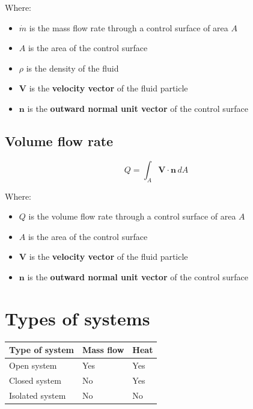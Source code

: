 \documentclass[11pt]{article}
\begin{document}
Where:
\begin{itemize}
\item \(\dot{m}\) is the mass flow rate through a control surface of area \(A\)
\item \(A\) is the area of the control surface
\item \(\rho\) is the density of the fluid
\item \(\boldsymbol{V}\) is the \textbf{velocity vector} of the fluid particle
\item \(\boldsymbol{n}\) is the \textbf{outward normal unit vector} of the control surface
\end{itemize}

\subsection{Volume flow rate}
\label{sec:orgc2857c3}
\[Q = \int_A \boldsymbol{V} \cdot \boldsymbol{n} \, dA\]

Where:
\begin{itemize}
\item \(Q\) is the volume flow rate through a control surface of area \(A\)
\item \(A\) is the area of the control surface
\item \(\boldsymbol{V}\) is the \textbf{velocity vector} of the fluid particle
\item \(\boldsymbol{n}\) is the \textbf{outward normal unit vector} of the control surface
\end{itemize}

\newpage

\section{Types of systems}
\label{sec:orgd65bb54}
\begin{center}
\begin{tabular}{l|l|l}
Type of system & Mass flow & Heat\\[0pt]
\hline
Open system & Yes & Yes\\[0pt]
Closed system & No & Yes\\[0pt]
Isolated system & No & No\\[0pt]
\end{tabular}
\end{center}
\end{document}
